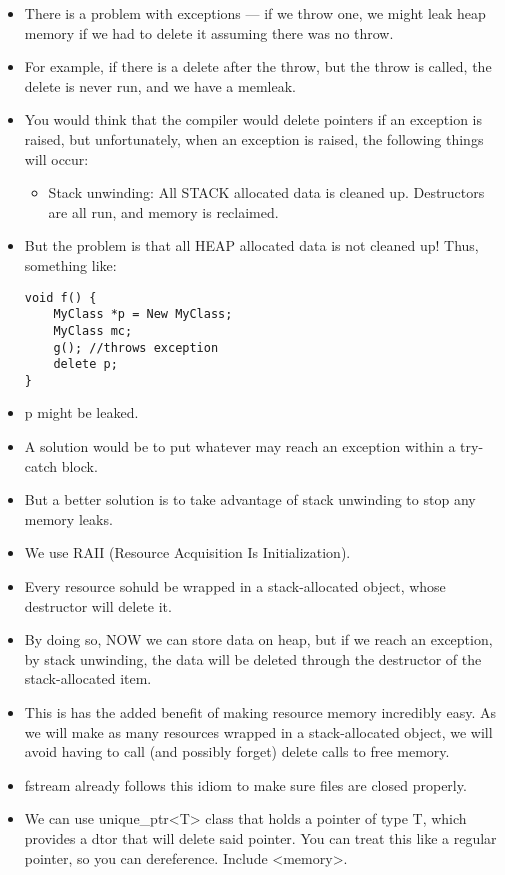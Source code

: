 \documentclass{article}
\begin{document}
\begin{itemize}
\item There is a problem with exceptions --- if we throw  one, we might leak heap memory if we had to delete it assuming there was no throw.
\item For example, if there is a delete after the throw, but the throw is called, the delete is never run, and we have a memleak.
\item You would think that the compiler would delete pointers if an exception is raised, but unfortunately, when an exception is raised, the following things will occur:
\begin{itemize}
\item Stack unwinding:  All STACK allocated data is cleaned up.  Destructors are all run, and memory is reclaimed.
\end{itemize}
\item But the problem is that all HEAP allocated data is not cleaned up!  Thus, something like:
\begin{lstlisting}
void f() {
    MyClass *p = New MyClass;
    MyClass mc;
    g(); //throws exception
    delete p;
}
\end{lstlisting}
\item p might be leaked.
\item A solution would be to put whatever may reach an exception within a try-catch block.
\item But a better solution is to take advantage of stack unwinding to stop any memory leaks.
\item We use RAII (Resource Acquisition Is Initialization).  
\item Every resource sohuld be wrapped in a stack-allocated object, whose destructor will delete it.
\item By doing so, NOW we can store data on heap, but if we reach an exception, by stack unwinding, the data will be deleted through the destructor of the stack-allocated item.
\item This is has the added benefit of making resource memory incredibly easy.  As we will make as many resources wrapped in a stack-allocated object, we will avoid having to call (and possibly forget) delete calls to free memory.
\item fstream already follows this idiom to make sure files are closed properly.
\item We can use unique_ptr<T> class that holds a pointer of type T, which provides a dtor that will delete said pointer.  You can treat this like a regular pointer, so you can dereference.  Include <memory>.

\end{itemize}
\end{document}
